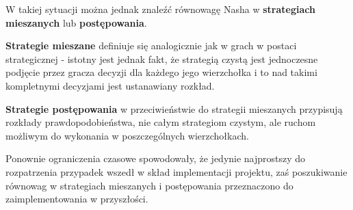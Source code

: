 \documentclass[polish]{standalone}
\begin{document}
W takiej sytuacji można jednak znaleźć równowagę Nasha w \textbf{strategiach mieszanych} lub \textbf{postępowania}.

\begin{definition}
\textbf{Strategie mieszane} definiuje się analogicznie jak w grach w postaci strategicznej - istotny jest jednak fakt,
że strategią czystą jest jednoczesne podjęcie przez gracza decyzji dla każdego jego wierzchołka i to nad takimi
kompletnymi decyzjami jest ustanawiany rozkład.
\end{definition}

\begin{definition}
\textbf{Strategie postępowania} w przeciwieństwie do strategii mieszanych przypisują rozkłady
prawdopodobieństwa, nie całym strategiom czystym, ale ruchom możliwym do wykonania w poszczególnych wierzchołkach.
\cite[str.~83]{FT-GT}
\end{definition}

Ponownie ograniczenia czasowe spowodowały, że jedynie najprostszy do rozpatrzenia przypadek wszedł w skład implementacji
projektu, zaś poszukiwanie równowag w strategiach mieszanych i postępowania przeznaczono do zaimplementowania
w przyszłości.
\end{document}
